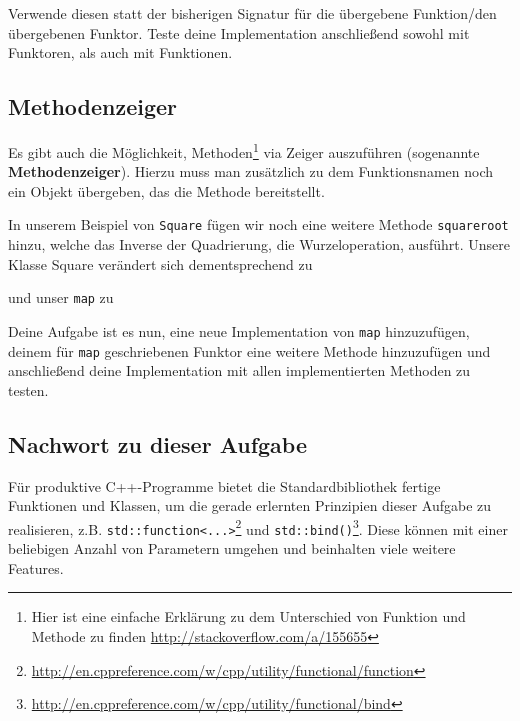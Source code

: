 Verwende diesen statt der bisherigen Signatur für die übergebene Funktion/den übergebenen Funktor.
Teste deine Implementation anschließend sowohl mit Funktoren, als auch mit Funktionen.

\subsection{Methodenzeiger}
\label{sec:functional_method}
Es gibt auch die Möglichkeit, Methoden\footnote{Hier ist eine einfache Erklärung zu dem Unterschied von Funktion und Methode zu finden \url{http://stackoverflow.com/a/155655}} via Zeiger auszuführen (sogenannte \textbf{Methodenzeiger}).
Hierzu muss man zusätzlich zu dem Funktionsnamen noch ein Objekt übergeben, das die Methode bereitstellt.

In unserem Beispiel von \lstinline{Square} fügen wir noch eine weitere Methode \lstinline{squareroot} hinzu, welche das Inverse der Quadrierung, die Wurzeloperation, ausführt.
Unsere Klasse Square verändert sich dementsprechend zu


und unser \lstinline{map} zu 


Deine Aufgabe ist es nun, eine neue Implementation von \lstinline{map} hinzuzufügen, deinem für \lstinline{map} geschriebenen Funktor eine weitere Methode hinzuzufügen und anschließend deine Implementation mit allen implementierten Methoden zu testen.

\subsection*{Nachwort zu dieser Aufgabe}
Für produktive C++-Programme bietet die Standardbibliothek fertige Funktionen und Klassen, um die gerade erlernten Prinzipien dieser Aufgabe zu realisieren, z.B. \lstinline{std::function<...>}\footnote{\url{http://en.cppreference.com/w/cpp/utility/functional/function}} und \lstinline{std::bind()}\footnote{\url{http://en.cppreference.com/w/cpp/utility/functional/bind}}.
Diese können mit einer beliebigen Anzahl von Parametern umgehen und beinhalten viele weitere Features.
